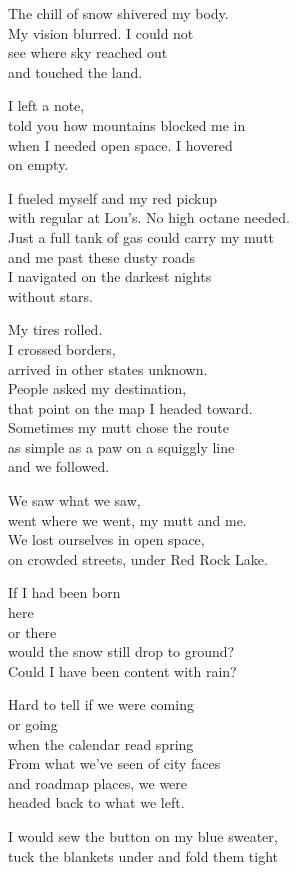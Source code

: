 \documentclass[twoside,10pt]{book}
\begin{document}
The chill of snow shivered my body.\\
My vision blurred. I could not\\
see where sky reached out\\
and touched the land.

I left a note,\\
told you how mountains blocked me in\\
when I needed open space. I hovered\\
on empty.

I fueled myself and my red pickup\\
with regular at Lou's. No high octane needed.\\
Just a full tank of gas could carry my mutt\\
and me past these dusty roads\\
I navigated on the darkest nights\\
without stars.

My tires rolled.\\
I crossed borders,\\
arrived in other states unknown.\\
People asked my destination,\\
that point on the map I headed toward.\\
Sometimes my mutt chose the route\\
as simple as a paw on a squiggly line\\
and we followed.

We saw what we saw,\\
went where we went, my mutt and me.\\
We lost ourselves in open space,\\
on crowded streets, under Red Rock Lake.

If I had been born\\
here\\
or there\\
would the snow still drop to ground?\\
Could I have been content with rain?

Hard to tell if we were coming\\
or going\\
when the calendar read spring\\
From what we've seen of city faces\\
and roadmap places, we were\\
headed back to what we left.

I would sew the button on my blue sweater,\\
tuck the blankets under and fold them tight
\end{document}

